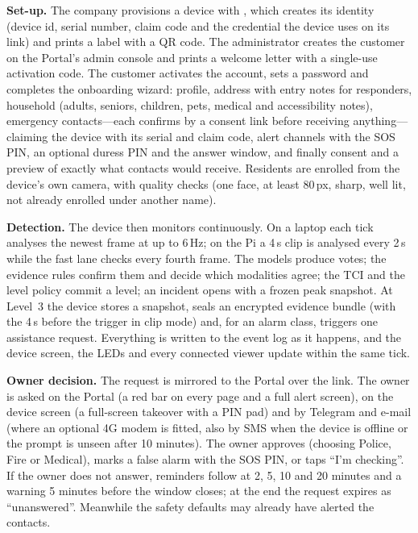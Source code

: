 \textbf{Set-up.} The company provisions a device with , which creates its identity (device id, serial number, claim code and the credential the device uses on its link) and prints a label with a QR code. The administrator creates the customer on the Portal's admin console and prints a welcome letter with a single-use activation code. The customer activates the account, sets a password and completes the onboarding wizard: profile, address with entry notes for responders, household (adults, seniors, children, pets, medical and accessibility notes), emergency contacts---each confirms by a consent link before receiving anything---claiming the device with its serial and claim code, alert channels with the SOS PIN, an optional duress PIN and the answer window, and finally consent and a preview of exactly what contacts would receive. Residents are enrolled from the device's own camera, with quality checks (one face, at least 80\,px, sharp, well lit, not already enrolled under another name).

\textbf{Detection.} The device then monitors continuously. On a laptop each tick analyses the newest frame at up to 6\,Hz; on the Pi a 4\,s clip is analysed every 2\,s while the fast lane checks every fourth frame. The models produce votes; the evidence rules confirm them and decide which modalities agree; the TCI and the level policy commit a level; an incident opens with a frozen peak snapshot. At Level~3 the device stores a snapshot, seals an encrypted evidence bundle (with the 4\,s before the trigger in clip mode) and, for an alarm class, triggers one assistance request. Everything is written to the event log as it happens, and the device screen, the LEDs and every connected viewer update within the same tick.

\textbf{Owner decision.} The request is mirrored to the Portal over the link. The owner is asked on the Portal (a red bar on every page and a full alert screen), on the device screen (a full-screen takeover with a PIN pad) and by Telegram and e-mail (where an optional 4G modem is fitted, also by SMS when the device is offline or the prompt is unseen after 10 minutes). The owner approves (choosing Police, Fire or Medical), marks a false alarm with the SOS PIN, or taps ``I'm checking''. If the owner does not answer, reminders follow at 2, 5, 10 and 20 minutes and a warning 5 minutes before the window closes; at the end the request expires as ``unanswered''. Meanwhile the safety defaults may already have alerted the contacts.

